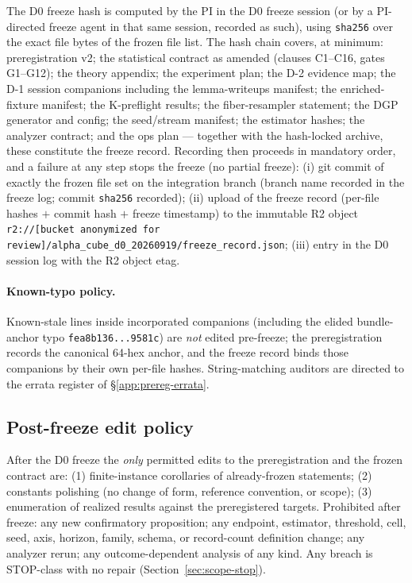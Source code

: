 The D0 freeze hash is computed by the PI in the D0 freeze session (or by a
PI-directed freeze agent in that same session, recorded as such), using
\texttt{sha256} over the exact file bytes of the frozen file list. The hash
chain covers, at minimum: preregistration v2; the statistical contract as
amended (clauses C1--C16, gates G1--G12); the theory appendix; the
experiment plan; the D-2 evidence map; the D-1 session companions including
the lemma-writeups manifest; the enriched-fixture manifest; the K-preflight
results; the fiber-resampler statement; the DGP generator and config; the
seed/stream manifest; the estimator hashes; the analyzer contract; and the
ops plan --- together with the hash-locked archive, these constitute the
freeze record. Recording then proceeds in mandatory order, and a failure at
any step stops the freeze (no partial freeze): (i) git commit of exactly the
frozen file set on the integration branch (branch name recorded in the
freeze log; commit
\texttt{sha256} recorded); (ii) upload of the freeze record (per-file hashes
$+$ commit hash $+$ freeze timestamp) to the immutable R2 object
\texttt{r2://[bucket anonymized for review]/alpha\_cube\_d0\_20260919/freeze\_record.json};
(iii) entry in the D0 session log with the R2 object etag.

\paragraph{Known-typo policy.}
Known-stale lines inside incorporated companions (including the elided
bundle-anchor typo \texttt{fea8b136...9581c}) are \emph{not} edited
pre-freeze; the preregistration records the canonical 64-hex anchor, and the
freeze record binds those companions by their own per-file hashes.
String-matching auditors are directed to the errata register of
\S\ref{app:prereg-errata}.

\subsection{Post-freeze edit policy}
\label{app:prereg-edits}

After the D0 freeze the \emph{only} permitted edits to the preregistration
and the frozen contract are: (1) finite-instance corollaries of
already-frozen statements; (2) constants polishing (no change of form,
reference convention, or scope); (3) enumeration of realized results against
the preregistered targets. Prohibited after freeze: any new confirmatory
proposition; any endpoint, estimator, threshold, cell, seed, axis, horizon,
family, schema, or record-count definition change; any analyzer rerun; any
outcome-dependent analysis of any kind. Any breach is STOP-class with no
repair (Section~\ref{sec:scope-stop}).

